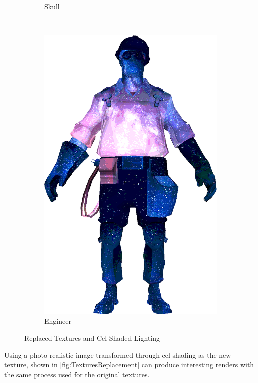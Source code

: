 \begin{figure}[h]
\begin{subfigure}[b]{0.16\textwidth}
        \caption{Skull}
        \label{fig:TextureReplacementSkull}
    \end{subfigure}
~
\hspace{24pt}
~
    \centering
    \begin{subfigure}[b]{0.13\textwidth}
        \includegraphics[width=\textwidth]{img/Combined/SpaceEngineerNoContour.png}
        \caption{Engineer}
        \label{fig:TextureReplacement}
    \end{subfigure}
    \caption{Replaced Textures and Cel Shaded Lighting}
    \label{fig:TexturesReplacement}
\end{figure}

Using a photo-realistic image transformed through cel shading as the new texture, shown in \autoref{fig:TexturesReplacement} can produce interesting 
renders with the same process used for the original textures. 

